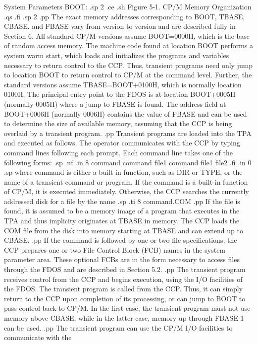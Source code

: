                              System Parameters
                  BOOT:
.sp 2
.ce
.sh
Figure 5-1.  CP/M Memory Organization
.qs
.fi
.sp 2
.pp
The exact memory addresses corresponding to BOOT, TBASE, CBASE, and FBASE
vary from version to version and are described fully in Section 6.  All
standard CP/M versions assume BOOT=0000H, which is the base of
random access memory.  The machine code found at location BOOT performs a
system warm start, which loads and initializes the programs and variables
necessary to return control to the CCP.  Thus, transient programs need only
jump to location BOOT to return control to CP/M at the command level.
Further, the standard versions assume TBASE=BOOT+0100H, which is normally
location 0100H.  The principal entry point to the FDOS is at location
BOOT+0005H (normally 0005H) where a jump to FBASE is found.  The address
field at BOOT+0006H (normally 0006H) contains the value of FBASE and can be
used to determine the size of available memory, assuming that the CCP is
being overlaid by a transient program.
.pp
Transient programs are loaded into the TPA and executed as follows.  The
operator communicates with the CCP by typing command lines following each
prompt.  Each command line takes one of the following forms:
.sp
.nf
.in 8
command
command file1
command file1 file2
.fi
.in 0
.sp
where command is either a built-in function, such as DIR or TYPE, or the name
of a transient command or program.  If the command is a built-in function of
CP/M, it is executed immediately.  Otherwise, the CCP searches the currently
addressed disk for a file by the name
.sp
.ti 8
command.COM
.pp
If the file is found, it is assumed to be a memory image of a program that
executes in the TPA and thus implicity originates at TBASE in memory.  The
CCP loads the COM file from the disk into memory starting at TBASE and can
extend up to CBASE.
.pp
If the command is followed by one or two file specifications, the CCP prepares
one or two File Control Block (FCB) names in the system 
parameter area.  These optional FCBs are in the form necessary to 
access files through the FDOS and are described in Section 5.2.
.pp
The transient program receives control from the CCP and begins 
execution, using the I/O facilities of the FDOS.  The transient 
program is called from the CCP.  Thus, it can simply return to the CCP upon
completion of its processing, or can jump to BOOT to pass control back to
CP/M.  In the first case, the transient program must not use memory above
CBASE, while in the latter case, memory up through FBASE-1 can be used.
.pp
The transient program can use the CP/M I/O facilities to communicate with the
